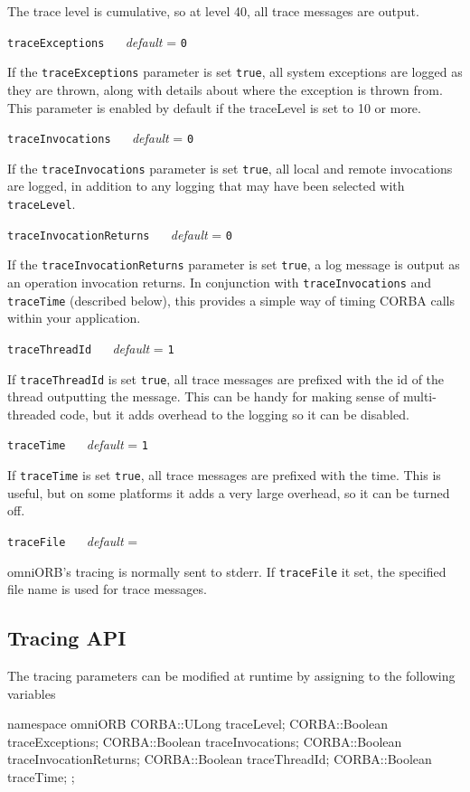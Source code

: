 \documentclass[11pt,twoside,a4paper]{book}
\makeatletter
\newcommand{\code}[1]{\texttt{#1}}
\newcommand{\confopt}[2]
  {\vspace{\baselineskip}\par\noindent\code{#1} ~~ \textit{default} =
   \code{#2}}
\renewcommand{\confopt}[2]
  {\vspace{\baselineskip}\par\noindent\code{#1} ~~ \textit{default} =
   \code{#2}\\[-1ex]\@afterheading}
\makeatother
\begin{document}
\vspace{\baselineskip}

\noindent The trace level is cumulative, so at level 40, all trace
messages are output.


\confopt{traceExceptions}{0}

If the \code{traceExceptions} parameter is set \code{true}, all system
exceptions are logged as they are thrown, along with details about
where the exception is thrown from. This parameter is enabled by
default if the traceLevel is set to 10 or more.


\confopt{traceInvocations}{0}

If the \code{traceInvocations} parameter is set \code{true}, all local
and remote invocations are logged, in addition to any logging that may
have been selected with \code{traceLevel}.


\confopt{traceInvocationReturns}{0}

If the \code{traceInvocationReturns} parameter is set \code{true}, a
log message is output as an operation invocation returns. In
conjunction with \code{traceInvocations} and \code{traceTime}
(described below), this provides a simple way of timing CORBA calls
within your application.


\confopt{traceThreadId}{1}

If \code{traceThreadId} is set \code{true}, all trace messages are
prefixed with the id of the thread outputting the message. This can be
handy for making sense of multi-threaded code, but it adds overhead to
the logging so it can be disabled.


\confopt{traceTime}{1}

If \code{traceTime} is set \code{true}, all trace messages are
prefixed with the time. This is useful, but on some platforms it adds
a very large overhead, so it can be turned off.


\confopt{traceFile}{}

omniORB's tracing is normally sent to stderr. If \code{traceFile} it
set, the specified file name is used for trace messages.


\subsection{Tracing API}

The tracing parameters can be modified at runtime by assigning to the
following variables

\begin{cxxlisting}
namespace omniORB {
  CORBA::ULong   traceLevel;
  CORBA::Boolean traceExceptions;
  CORBA::Boolean traceInvocations;
  CORBA::Boolean traceInvocationReturns;
  CORBA::Boolean traceThreadId;
  CORBA::Boolean traceTime;
};
\end{cxxlisting}
\end{document}

